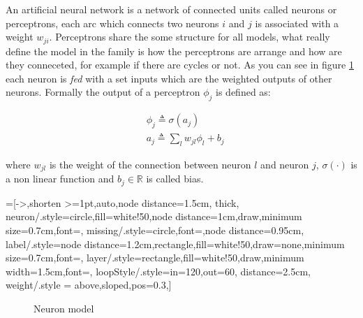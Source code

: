  
An artificial neural network is a network of connected units called neurons or perceptrons, each arc which connects two neurons $i$ and $j$ is associated with a weight $w_{ji}$. Perceptrons share the some
structure for all models, what really define the model in the family is how the perceptrons are arrange and how are they conneceted, for example if there are cycles or not.
As you can see in figure \ref{neuron_model} each neuron is \textit{fed} with a set inputs which are the weighted outputs of other neurons. Formally the output of a perceptron $\phi_j$
is defined as:
 
\begin{align}
&\phi_j \triangleq \sigma(a_j)\\
&a_j \triangleq \sum_l w_{jl}\phi_l +b_j
\end{align}

where $w_{jl}$ is the weight of the connection between neuron $l$ and neuron $j$, $\sigma(\cdot)$ is a non linear function and $b_j \in \mathbb{R}$ is called bias.


=[->,shorten >=1pt,auto,node distance=1.5cm,
  thick,
  neuron/.style={circle,fill=white!50,node distance=1cm,draw,minimum size=0.7cm,font=\sffamily\normalsize},
  missing/.style={circle,font=\sffamily\Large,node distance=0.95cm},
  label/.style={node distance=1.2cm,rectangle,fill=white!50,draw=none,minimum size=0.7cm,font=\sffamily\normalsize},
  layer/.style={rectangle,fill=white!50,draw,minimum width=1.5cm,font=\sffamily\Large},
  loopStyle/.style={in=120,out=60, distance=2.5cm},
  weight/.style = {above,sloped,pos=0.3},]
\begin{figure}
 \centering
{}
\caption{Neuron model}
\label{neuron_model}
\end{figure}


